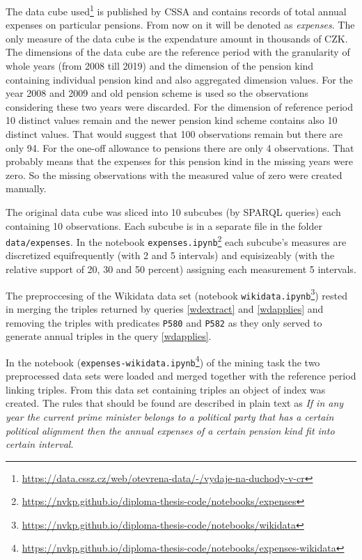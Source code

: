 The data cube used\footnote{\href{https://data.cssz.cz/web/otevrena-data/-/vydaje-na-duchody-v-cr}{https://data.cssz.cz/web/otevrena-data/-/vydaje-na-duchody-v-cr}} is published by CSSA and contains records of total annual expenses on particular pensions. From now on it will be denoted as \textit{expenses}. The only measure of the data cube is the expendature amount in thousands of CZK. The dimensions of the data cube are the reference period with the granularity of whole years (from 2008 till 2019) and the dimension of the pension kind containing individual pension kind and also aggregated dimension values. For the year 2008 and 2009 and old pension scheme is used so the observations considering these two years were discarded. For the dimension of reference period 10 distinct values remain and the newer pension kind scheme contains also 10 distinct values. That would suggest that 100 observations remain but there are only 94. For the one-off allowance to pensions there are only 4 observations. That probably means that the expenses for this pension kind in the missing years were zero. So the missing observations with the measured value of zero were created manually.

The original data cube was sliced into 10 subcubes (by SPARQL queries) each containing 10 observations. Each subcube is in a separate file in the folder \verb|data/expenses|. In the notebook \verb|expenses.ipynb|\footnote{\href{https://nvkp.github.io/diploma-thesis-code/notebooks/expenses}{https://nvkp.github.io/diploma-thesis-code/notebooks/expenses}} each subcube's measures are discretized equifrequently (with 2 and 5 intervals) and equisizeably (with the relative support of 20, 30 and 50 percent) assigning each measurement 5 intervals.

The preproccesing of the Wikidata data set (notebook \verb|wikidata.ipynb|\footnote{\href{https://nvkp.github.io/diploma-thesis-code/notebooks/wikidata}{https://nvkp.github.io/diploma-thesis-code/notebooks/wikidata}}) rested in merging the triples returned by queries \ref{wdextract} and \ref{wdapplies} and removing the triples with predicates \verb|P580| and \verb|P582| as they only served to generate annual triples in the query \ref{wdapplies}.

In the notebook (\verb|expenses-wikidata.ipynb|\footnote{\href{https://nvkp.github.io/diploma-thesis-code/notebooks/expenses-wikidata}{https://nvkp.github.io/diploma-thesis-code/notebooks/expenses-wikidata}}) of the mining task the two preprocessed data sets were loaded and merged together with the reference period linking triples. From this data set containing  triples an object of index was created. The rules that should be found are described in plain text as \textit{If in any year the current prime minister belongs to a political party that has a certain political alignment then the annual expenses of a certain pension kind fit into certain interval}. 

